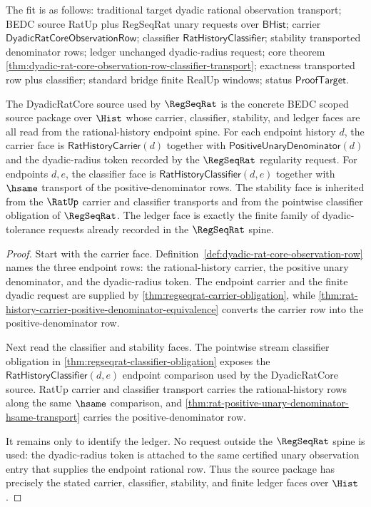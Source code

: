 The fit is as follows: traditional target dyadic rational observation
transport; BEDC source RatUp plus RegSeqRat unary requests over
$\mathsf{BHist}$; carrier $\mathsf{DyadicRatCoreObservationRow}$; classifier
$\mathsf{RatHistoryClassifier}$; stability transported denominator rows;
ledger unchanged dyadic-radius request; core theorem
\autoref{thm:dyadic-rat-core-observation-row-classifier-transport};
exactness transported row plus classifier; standard bridge finite RealUp
windows; status $\mathsf{ProofTarget}$.

\begin{theorem}
\label{thm:dyadic-rat-core-scoped-source-package}
The DyadicRatCore source used by $\RegSeqRat$ is the concrete BEDC scoped
source package over $\Hist$ whose carrier, classifier, stability, and ledger
faces are all read from the rational-history endpoint spine. For each endpoint
history $d$, the carrier face is
$\mathsf{RatHistoryCarrier}(d)$ together with
$\mathsf{PositiveUnaryDenominator}(d)$ and the dyadic-radius token recorded by
the $\RegSeqRat$ regularity request. For endpoints $d,e$, the classifier face
is $\mathsf{RatHistoryClassifier}(d,e)$ together with $\hsame$ transport of the
positive-denominator rows. The stability face is inherited from the $\RatUp$
carrier and classifier transports and from the pointwise classifier obligation
of $\RegSeqRat$. The ledger face is exactly the finite family of
dyadic-tolerance requests already recorded in the $\RegSeqRat$ spine.
\end{theorem}
\begin{proof}
Start with the carrier face. Definition~\ref{def:dyadic-rat-core-observation-row}
names the three endpoint rows: the rational-history carrier, the positive
unary denominator, and the dyadic-radius token. The endpoint carrier and the
finite dyadic request are supplied by
\autoref{thm:regseqrat-carrier-obligation}, while
\autoref{thm:rat-history-carrier-positive-denominator-equivalence} converts
the carrier row into the positive-denominator row.

Next read the classifier and stability faces. The pointwise stream classifier
obligation in \autoref{thm:regseqrat-classifier-obligation} exposes the
$\mathsf{RatHistoryClassifier}(d,e)$ endpoint comparison used by the
DyadicRatCore source. RatUp carrier and classifier transport carries the
rational-history rows along the same $\hsame$ comparison, and
\autoref{thm:rat-positive-unary-denominator-hsame-transport} carries the
positive-denominator row.

It remains only to identify the ledger. No request outside the
$\RegSeqRat$ spine is used: the dyadic-radius token is attached to the same
certified unary observation entry that supplies the endpoint rational row.
Thus the source package has precisely the stated carrier, classifier,
stability, and finite ledger faces over $\Hist$.
\end{proof}

